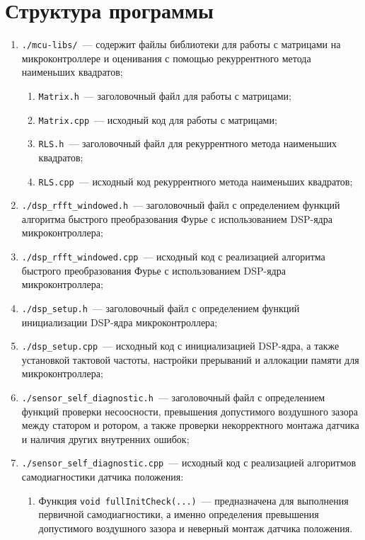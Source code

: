 \newpage
\section{Структура программы}

\begin{enumerate}
    \item \verb|./mcu-libs/|~--- содержит файлы библиотеки для работы с матрицами на микроконтроллере и оценивания с помощью рекуррентного метода наименьших квадратов;
    \begin{enumerate}
        \item \verb|Matrix.h|~--- заголовочный файл для работы с матрицами;
        \item \verb|Matrix.cpp|~--- исходный код для работы с матрицами;
        \item \verb|RLS.h|~--- заголовочный файл для рекуррентного метода наименьших квадратов;
        \item \verb|RLS.cpp|~--- исходный код рекуррентного метода наименьших квадратов;
    \end{enumerate}
    \item \verb|./dsp_rfft_windowed.h|~--- заголовочный файл с определением функций алгоритма быстрого преобразования Фурье с использованием DSP-ядра микроконтроллера;
    \item \verb|./dsp_rfft_windowed.cpp|~--- исходный код с реализацией алгоритма быстрого преобразования Фурье с использованием DSP-ядра микроконтроллера;
    \item \verb|./dsp_setup.h|~--- заголовочный файл с определением функций инициализации DSP-ядра микроконтроллера;
    \item \verb|./dsp_setup.cpp|~--- исходный код с инициализацией DSP-ядра, а также установкой тактовой частоты, настройки прерываний и аллокации памяти для микроконтроллера;
    \item \verb|./sensor_self_diagnostic.h|~--- заголовочный файл с определением функций проверки несоосности, превышения допустимого воздушного зазора между статором и ротором, а также проверки некорректного монтажа датчика и наличия других внутренних ошибок;
    \item \verb|./sensor_self_diagnostic.cpp|~--- исходный код с реализацией алгоритмов самодиагностики датчика положения:
    \begin{enumerate}
        \item Функция \verb|void fullInitCheck(...)|~--- предназначена для выполнения первичной самодиагностики, а именно определения превышения допустимого воздушного зазора и неверный монтаж датчика положения.

\end{enumerate}
\end{enumerate}
